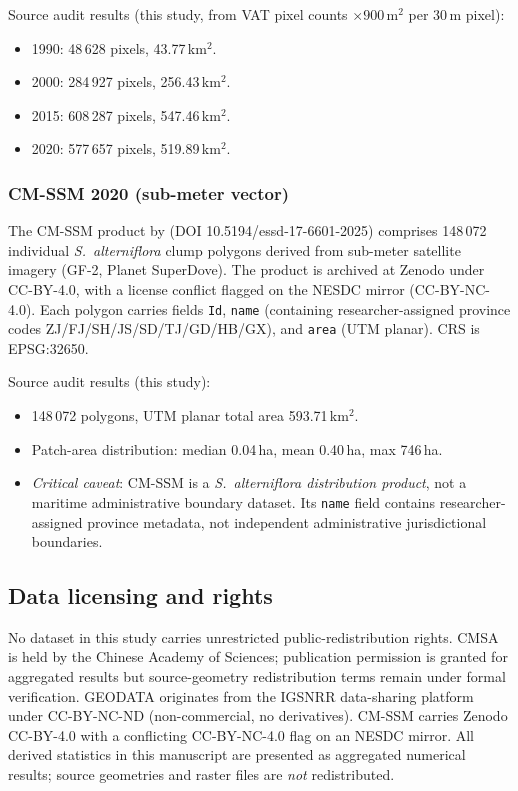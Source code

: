 \documentclass[11pt]{article}
\begin{document}
Source audit results (this study, from VAT pixel counts $\times 900\,\text{m}^2$
per 30\,m pixel):
\begin{itemize}[nosep]
\item 1990: 48\,628 pixels, 43.77\,km$^2$.
\item 2000: 284\,927 pixels, 256.43\,km$^2$.
\item 2015: 608\,287 pixels, 547.46\,km$^2$.
\item 2020: 577\,657 pixels, 519.89\,km$^2$.
\end{itemize}

\subsubsection{CM-SSM 2020 (sub-meter vector)}

The CM-SSM product by \citet{zhou_2025_cmssm} (DOI 10.5194/essd-17-6601-2025)
comprises 148\,072 individual \textit{S.~alterniflora} clump polygons derived
from sub-meter satellite imagery (GF-2, Planet SuperDove). The product is
archived at Zenodo under CC-BY-4.0, with a license conflict flagged on the
NESDC mirror (CC-BY-NC-4.0). Each polygon carries fields \texttt{Id},
\texttt{name} (containing researcher-assigned province codes ZJ/FJ/SH/JS/SD/TJ/GD/HB/GX),
and \texttt{area} (UTM planar). CRS is EPSG:32650.

Source audit results (this study):
\begin{itemize}[nosep]
\item 148\,072 polygons, UTM planar total area 593.71\,km$^2$.
\item Patch-area distribution: median 0.04\,ha, mean 0.40\,ha, max 746\,ha.
\item \emph{Critical caveat}: CM-SSM is a \textit{S.~alterniflora distribution
  product}, not a maritime administrative boundary dataset. Its \texttt{name}
  field contains researcher-assigned province metadata, not independent
  administrative jurisdictional boundaries.
\end{itemize}

\subsection{Data licensing and rights}

No dataset in this study carries unrestricted public-redistribution rights.
CMSA is held by the Chinese Academy of Sciences; publication permission is
granted for aggregated results but source-geometry redistribution terms remain
under formal verification. GEODATA originates from the IGSNRR data-sharing
platform under CC-BY-NC-ND (non-commercial, no derivatives). CM-SSM carries
Zenodo CC-BY-4.0 with a conflicting CC-BY-NC-4.0 flag on an NESDC mirror. All
derived statistics in this manuscript are presented as aggregated numerical
results; source geometries and raster files are \emph{not} redistributed.
\end{document}
